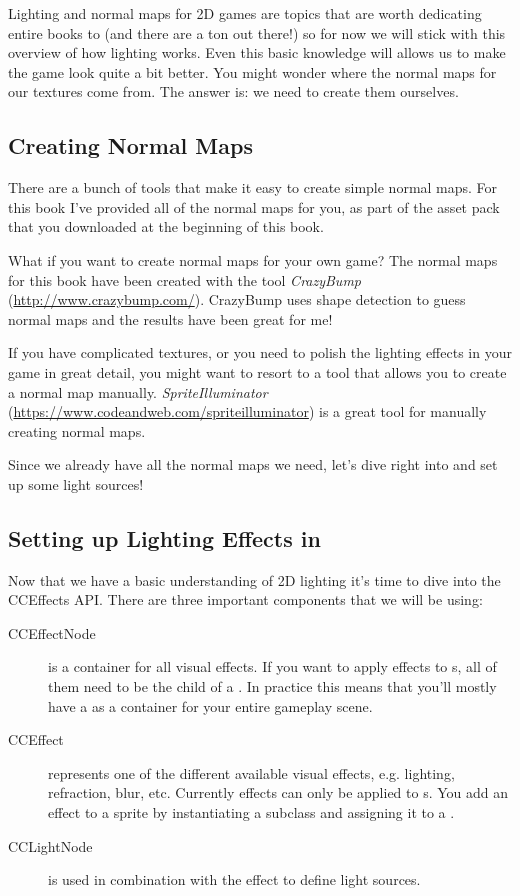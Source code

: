 Lighting and normal maps for 2D games are topics that are worth dedicating
entire books to (and there are a ton out there!) so for now we will stick with
this overview of how lighting works. Even this basic knowledge will allows us to
make the game look quite a bit better. You might wonder where the normal maps
for our textures come from. The answer is: we need to create them ourselves. 

\subsection{Creating Normal Maps}
There are a bunch of tools that make it easy to create simple normal maps. For this book I've provided all of the normal maps for you, as
part of the asset pack that you downloaded at the beginning of this book.

What if you want to create normal maps for your own game? The normal maps for
this book have been created with the tool \textit{CrazyBump}
(\url{http://www.crazybump.com/}). CrazyBump uses shape detection to guess
normal maps and the results have been great for me!

If you have complicated textures, or you need to polish the lighting effects in
your game in great detail, you might want to resort to a tool that allows you to
create a normal map manually. \textit{SpriteIlluminator}
(\url{https://www.codeandweb.com/spriteilluminator}) is a great tool for
manually creating normal maps.

Since we already have all the normal maps we need, let's dive right into \SB{}
and set up some light sources!

\subsection{Setting up Lighting Effects in \SB{}}
Now that we have a basic understanding of 2D lighting it's time to dive into the
CCEffects API. There are three important components that we will be using:
\begin{description}
\item[CCEffectNode] is a container for all visual effects. If
you want to apply effects to \ccsprite{}s, all of them need to be the child of a
. In practice this means that you'll mostly have a
 as a container for your entire gameplay scene.
\item[CCEffect] represents one of the different available visual effects, e.g.
lighting, refraction, blur, etc. Currently effects can only be applied to
\ccsprite{}s. You add an effect to a sprite by instantiating a
 subclass and assigning it to a \ccsprite{}.
\item[CCLightNode] is used in combination with the effect
 to define light sources.
\end{description}

